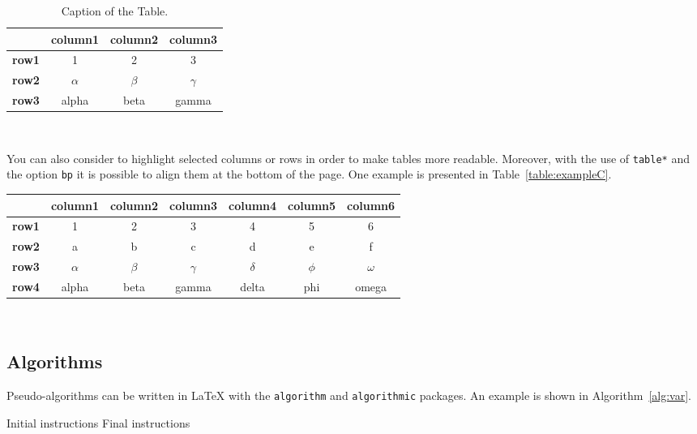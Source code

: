\begin{table}[H]
	\caption*{\textbf{Example of Table (optional)}}
	\centering 
	\begin{tabular}{|p{3em} c c c |}
		\hline
		\rowcolor{bluePoli!40}
		& \textbf{column1} & \textbf{column2} & \textbf{column3} \T\B \\
		\hline \hline
		\textbf{row1} & 1 & 2 & 3 \T\B \\
		\textbf{row2} & $\alpha$ & $\beta$ & $\gamma$ \T\B\\
		\textbf{row3} & alpha & beta & gamma \B\\
		\hline
	\end{tabular}
	\\[10pt]
	\caption{Caption of the Table.}
	\label{table:example}
\end{table}

You can also consider to highlight selected columns or rows in order to make tables more readable.
Moreover, with the use of \texttt{table*} and the option \texttt{bp} it is possible to align them at the bottom of the page. One example is presented in Table~\ref{table:exampleC}. 

\begin{table*}[bp]
	\centering 
	\begin{tabular}{|p{3em} | c | c | c | c | c | c|}
		\hline
		& \textbf{column1} & \textbf{column2} & \textbf{column3} & \textbf{column4} & \textbf{column5} & \textbf{column6} \T\B \\
		\hline \hline
		\textbf{row1} & 1 & 2 & 3 & 4 & 5 & 6 \T\B\\
		\textbf{row2} & a & b & c & d & e & f \T\B\\
		\textbf{row3} & $\alpha$ & $\beta$ & $\gamma$ & $\delta$ & $\phi$ & $\omega$ \T\B\\
		\textbf{row4} & alpha & beta & gamma & delta & phi & omega \B\\
		\hline
	\end{tabular}
	\\[10pt]
	\caption{Highlighting the columns}
	\label{table:exampleC}
\end{table*}

\subsection{Algorithms}
\label{subsec:algorithms}

Pseudo-algorithms can be written in \LaTeX{} with the \texttt{algorithm} and \texttt{algorithmic} packages.
An example is shown in Algorithm~\ref{alg:var}.
\begin{algorithm}[H]
	\label{alg:example}
	\caption{Name of the Algorithm}
	\label{alg:var}
	\label{protocol1}
	\begin{algorithmic}[1]
		\STATE Initial instructions
		\ENDIF
		\ENDFOR
		\ENDWHILE
		\STATE Final instructions
	\end{algorithmic}
\end{algorithm} 

